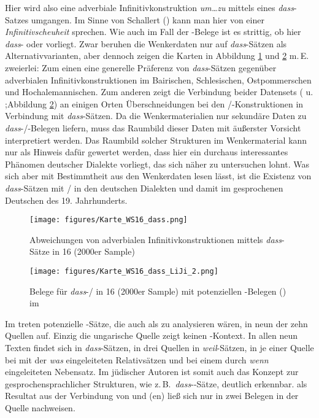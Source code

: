 {} Hier wird also eine adverbiale Infinitivkonstruktion \textit{um…zu} mittels eines \textit{dass}-Satzes umgangen. Im Sinne von Schallert (\citeyear{Schallert2013b}) kann man hier von einer \textit{Infinitivscheuheit} sprechen. Wie auch im Fall der \hai{{\LiJi}}-Belege ist es strittig, ob hier \textit{dass}- oder \hai{{\VPR}} vorliegt. Zwar beruhen die Wenkerdaten nur auf \textit{dass}-Sätzen als Alternativvarianten, aber dennoch zeigen die Karten in Abbildung \ref{wenkerkarte16_1} und \ref{wenkerkarte16_2} m.\,E. zweierlei: Zum einen eine generelle Präferenz von \textit{dass}-Sätzen gegenüber adverbialen Infinitivkonstruktionen im Bairischen, Schlesischen, Ostpommerschen und Hochalemannischen. Zum anderen zeigt die Verbindung beider Datensets ( u. ;Abbildung \ref{wenkerkarte16_2}) an einigen Orten Überschneidungen bei den /\hai{{\VPR}}-Konstruktionen in Verbindung mit \textit{dass}-Sätzen. Da die Wenkermaterialien nur sekundäre Daten zu \textit{dass}-/\hai{{\VPR}}-Belegen liefern, muss das Raumbild dieser Daten mit äußerster Vorsicht interpretiert werden. Das Raumbild solcher Strukturen im Wenkermaterial kann nur als Hinweis dafür gewertet werden, dass hier ein durchaus interessantes Phänomen deutscher Dialekte vorliegt, das sich näher zu untersuchen lohnt. Was sich aber mit Bestimmtheit aus den Wenkerdaten lesen lässt, ist die Existenz von \textit{dass}-Sätzen mit /\hai{{\VPR}} in den deutschen Dialekten und damit im gesprochenen Deutschen des 19. Jahrhunderts. 




\begin{figure}[t]

\texttt{[image: figures/Karte\_WS16\_dass.png]}
		\caption{\label{wenkerkarte16_1} Abweichungen von adverbialen Infinitivkonstruktionen mittels \textit{dass}-Sätze in  16 (2000er Sample)}
	\end{figure}
	

\begin{figure}[t]
\texttt{[image: figures/Karte\_WS16\_dass\_LiJi\_2.png]}
		\caption{\label{wenkerkarte16_2} Belege für \textit{dass}-/\hai{{\VPR}} in  16 (2000er Sample) mit potenziellen -Belegen (\hai{{\VPR}}) im }
	\end{figure}


Im  treten potenzielle -Sätze, die auch als \hai{{\VPR}} zu analysieren wären, in neun der zehn Quellen auf. Einzig die ungarische Quelle  zeigt keinen -Kontext. In allen neun Texten findet sich  in \textit{dass}-Sätzen, in drei Quellen in \textit{weil}-Sätzen, in je einer Quelle bei mit der  \textit{was} eingeleiteten Relativsätzen und bei einem durch \textit{wenn} eingeleiteten Nebensatz. Im  jüdischer Autoren ist somit auch das Konzept zur  gesprochensprachlicher Strukturen, wie z.\,B.\, \textit{dass}--Sätze, deutlich erkennbar.  als Resultat aus der Verbindung von \hai{{\VR}} und (en) ließ sich nur in zwei Belegen in der Quelle  nachweisen.


